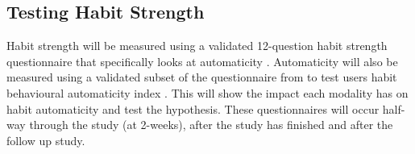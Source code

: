 \subsection{Testing Habit Strength}
Habit strength will be measured using a validated 12-question habit strength questionnaire that specifically looks at automaticity \cite{article_habit_strength}. Automaticity will also be measured using a validated subset of the questionnaire from \cite{article_habit_strength} to test users habit behavioural automaticity index \cite{article_habit_measurement}. This will show the impact each modality has on habit automaticity and test the hypothesis. These questionnaires \cite{article_habit_strength, article_habit_measurement} will occur half-way through the study (at 2-weeks), after the study has finished and after the follow up study.
